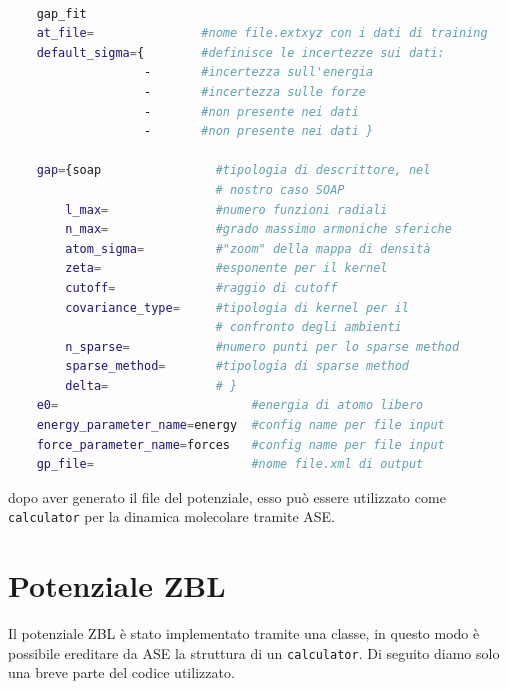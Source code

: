 \documentclass[a4paper,11pt,openany]{book}
\begin{document}
\begin{lstlisting}[caption={Snippet per il calcolo del GAP}, label={code:gap-libatom}, language=bash]

    gap_fit 
    at_file=               #nome file.extxyz con i dati di training 
    default_sigma={        #definisce le incertezze sui dati:
                   -       #incertezza sull'energia
                   -       #incertezza sulle forze 
                   -       #non presente nei dati
                   -       #non presente nei dati }
                    
    gap={soap                #tipologia di descrittore, nel 
                             # nostro caso SOAP
        l_max=               #numero funzioni radiali
        n_max=               #grado massimo armoniche sferiche  
        atom_sigma=          #"zoom" della mappa di densità  
        zeta=                #esponente per il kernel
        cutoff=              #raggio di cutoff
        covariance_type=     #tipologia di kernel per il 
                             # confronto degli ambienti
        n_sparse=            #numero punti per lo sparse method
        sparse_method=       #tipologia di sparse method
        delta=               # } 
    e0=                           #energia di atomo libero
    energy_parameter_name=energy  #config name per file input
    force_parameter_name=forces   #config name per file input
    gp_file=                      #nome file.xml di output 

\end{lstlisting}

dopo aver generato il file del potenziale, esso può essere utilizzato come \texttt{calculator} per la dinamica molecolare tramite ASE.


\section{Potenziale ZBL} %

Il potenziale ZBL è stato implementato tramite una classe, in questo modo è possibile ereditare da ASE la struttura di un \texttt{calculator}. Di seguito diamo solo una breve parte del codice utilizzato.
\end{document}
